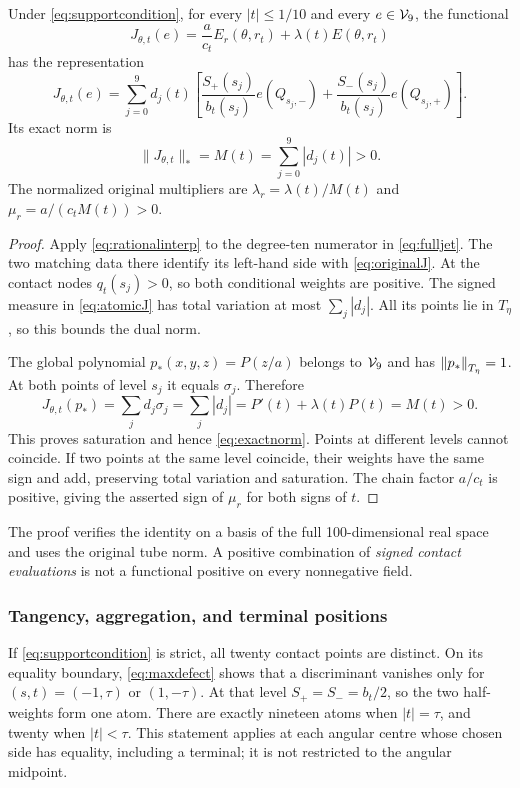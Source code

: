 \documentclass[11pt,a4paper]{article}
\begin{document}
\begin{theorem}\label{thm:certificate}
Under \eqref{eq:supportcondition}, for every $|t|\le1/10$ and
every $e\in\mathcal V_9$, the functional
\begin{equation}\label{eq:originalJ}
 J_{\theta,t}(e)=\frac{a}{c_t}E_r(\theta,r_t)+
                                  \lambda(t)E(\theta,r_t)
\end{equation}
has the representation
\begin{equation}\label{eq:atomicJ}
 J_{\theta,t}(e)=\sum_{j=0}^{9}d_j(t)
 \left[\frac{S_+(s_j)}{b_t(s_j)}e(Q_{s_j,-})+
       \frac{S_-(s_j)}{b_t(s_j)}e(Q_{s_j,+})\right].
\end{equation}
Its exact norm is
\begin{equation}\label{eq:exactnorm}
 \|J_{\theta,t}\|_*=M(t)=\sum_{j=0}^{9}|d_j(t)|>0.
\end{equation}
The normalized original multipliers are
$\lambda_r=\lambda(t)/M(t)$ and $\mu_r=a/(c_tM(t))>0$.
\end{theorem}
\begin{proof}
Apply \eqref{eq:rationalinterp} to the degree-ten numerator in
\eqref{eq:fulljet}. The two matching data there identify its left-hand
side with \eqref{eq:originalJ}. At the contact nodes $q_t(s_j)>0$,
so both conditional weights are positive. The signed measure in
\eqref{eq:atomicJ} has total variation at most $\sum_j|d_j|$.
All its points lie in $T_\eta$, so this bounds the dual norm.

The global polynomial $p_*(x,y,z)=P(z/a)$ belongs to $\mathcal V_9$ and
has $\left\lVert p_*\right\rVert_{T_\eta}=1$. At both points of level $s_j$ it equals
$\sigma_j$. Therefore
\[
 J_{\theta,t}(p_*)=\sum_jd_j\sigma_j=
                   \sum_j|d_j|=P'(t)+\lambda(t)P(t)=M(t)>0.
\]
This proves saturation and hence \eqref{eq:exactnorm}. Points at
different levels cannot coincide. If two points at the same level
coincide, their weights have the same sign and add, preserving total
variation and saturation. The chain factor $a/c_t$ is positive,
giving the asserted sign of $\mu_r$ for both signs of $t$.
\end{proof}

The proof verifies the identity on a basis of the full
100-dimensional real space and
uses the original tube norm. A positive combination of
\emph{signed contact evaluations} is not a functional positive on
every nonnegative field.

\subsubsection{Tangency, aggregation, and terminal positions}
If \eqref{eq:supportcondition} is strict, all twenty contact points
are distinct. On its equality boundary, \eqref{eq:maxdefect} shows
that a discriminant vanishes only for $(s,t)=(-1,\tau)$ or
$(1,-\tau)$. At that level $S_+=S_-=b_t/2$, so the two
half-weights form one atom. There are exactly nineteen atoms when
$|t|=\tau$, and twenty when $|t|<\tau$. This statement applies at
each angular centre whose chosen side has equality, including a
terminal; it is not restricted to the angular midpoint.
\end{document}
